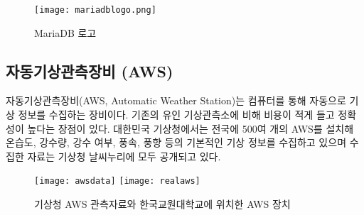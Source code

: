 \begin{figure}[htbp]
	\centering
	\texttt{[image: mariadblogo.png]}
	\caption{MariaDB 로고}
	\label{MariaDB}
\end{figure}

\subsection{자동기상관측장비 (AWS)}
자동기상관측장비(AWS, Automatic Weather Station)는 컴퓨터를 통해 자동으로 기상 정보를 수집하는 장비이다. 기존의 유인 기상관측소에 비해 비용이 적게 들고 정확성이 높다는 장점이 있다. 대한민국 기상청에서는 전국에 500여 개의 AWS를 설치해 온습도, 강수량, 강수 여부, 풍속, 풍향 등의 기본적인 기상 정보를 수집하고 있으며 수집한 자료는 기상청 날씨누리에 모두 공개되고 있다. \cite{Ref4}

\begin{figure}[htbp]
	\centering
	\texttt{[image: awsdata]}
	\texttt{[image: realaws]}
	\caption{기상청 AWS 관측자료와 한국교원대학교에 위치한 AWS 장치}
	\label{AWS}
\end{figure}